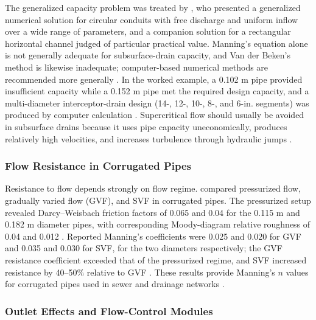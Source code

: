 The generalized capacity problem was treated by \textcite{Graber2004}, who presented a
generalized numerical solution for circular conduits with free discharge and uniform
inflow over a wide range of parameters, and a companion solution for a rectangular
horizontal channel judged of particular practical value. Manning's equation alone is not
generally adequate for subsurface-drain capacity, and Van der Beken's method is likewise
inadequate; computer-based numerical methods are recommended more generally
\parencite{Graber2004}. In the worked example, a 0.102 m pipe provided insufficient
capacity while a 0.152 m pipe met the required design capacity, and a multi-diameter
interceptor-drain design (14-, 12-, 10-, 8-, and 6-in. segments) was produced by computer
calculation \parencite{Graber2004}. Supercritical flow should usually be avoided in
subsurface drains because it uses pipe capacity uneconomically, produces relatively high
velocities, and increases turbulence through hydraulic jumps \parencite{Graber2004}.

\subsubsection{Flow Resistance in Corrugated Pipes}

Resistance to flow depends strongly on flow regime. \textcite{Kouchakzadeh2011} compared
pressurized flow, gradually varied flow (GVF), and SVF in corrugated pipes. The pressurized
setup revealed Darcy--Weisbach friction factors of 0.065 and 0.04 for the 0.115 m and
0.182 m diameter pipes, with corresponding Moody-diagram relative roughness of 0.04 and
0.012 \parencite{Kouchakzadeh2011}. Reported Manning's coefficients were 0.025 and 0.020
for GVF and 0.035 and 0.030 for SVF, for the two diameters respectively; the GVF resistance
coefficient exceeded that of the pressurized regime, and SVF increased resistance by
40--50\% relative to GVF \parencite{Kouchakzadeh2011}. These results provide Manning's $n$
values for corrugated pipes used in sewer and drainage networks \parencite{Kouchakzadeh2011}.

\subsubsection{Outlet Effects and Flow-Control Modules}

